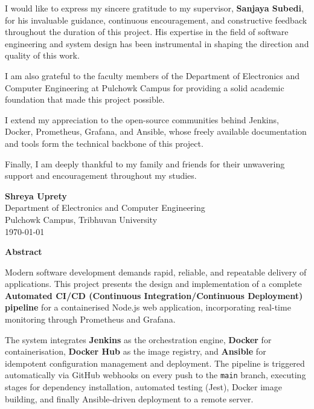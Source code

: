\documentclass[12pt,a4paper]{report}
\begin{document}
I would like to express my sincere gratitude to my supervisor, \textbf{Sanjaya Subedi}, for his invaluable guidance, continuous encouragement, and constructive feedback throughout the duration of this project. His expertise in the field of software engineering and system design has been instrumental in shaping the direction and quality of this work.

I am also grateful to the faculty members of the Department of Electronics and Computer Engineering at Pulchowk Campus for providing a solid academic foundation that made this project possible.

I extend my appreciation to the open-source communities behind Jenkins, Docker, Prometheus, Grafana, and Ansible, whose freely available documentation and tools form the technical backbone of this project.

Finally, I am deeply thankful to my family and friends for their unwavering support and encouragement throughout my studies.

\vspace{2cm}
\noindent
\textbf{Shreya Uprety}\\
Department of Electronics and Computer Engineering\\
Pulchowk Campus, Tribhuvan University\\
\today

\newpage
\thispagestyle{plain}
\begin{center}
    {\LARGE \textbf{Abstract}}
\end{center}
\vspace{1cm}

Modern software development demands rapid, reliable, and repeatable delivery of applications. This project presents the design and implementation of a complete \textbf{Automated CI/CD (Continuous Integration/Continuous Deployment) pipeline} for a containerised Node.js web application, incorporating real-time monitoring through Prometheus and Grafana.

The system integrates \textbf{Jenkins} as the orchestration engine, \textbf{Docker} for containerisation, \textbf{Docker Hub} as the image registry, and \textbf{Ansible} for idempotent configuration management and deployment. The pipeline is triggered automatically via GitHub webhooks on every push to the \texttt{main} branch, executing stages for dependency installation, automated testing (Jest), Docker image building, and finally Ansible-driven deployment to a remote server.
\end{document}

